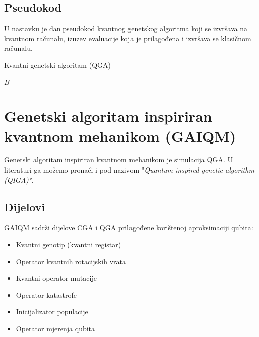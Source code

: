 \documentclass[times, utf8, zavrsni, numeric]{fer}
\begin{document}
\subsection{Pseudokod}
U nastavku je dan pseudokod kvantnog genetskog algoritma koji se izvršava na kvantnom računalu, izuzev evaluacije koja je prilagođena i izvršava se klasičnom računalu.

\begin{algorithm}
\caption{Kvantni genetski algoritam (QGA)}
\label{algo:qga}
\begin{algorithmic}
\ENDWHILE
\RETURN $B$
\end{algorithmic}
\end{algorithm}

\newpage

\section{Genetski algoritam inspiriran kvantnom mehanikom (GAIQM)}
Genetski algoritam inspiriran kvantnom mehanikom je simulacija QGA. U literaturi ga možemo pronaći i pod nazivom "\it Quantum inspired genetic algorithm (QIGA)\rm". \citep{han_phd}

\subsection{Dijelovi}
GAIQM sadrži dijelove CGA i QGA prilagođene korištenoj aproksimaciji qubita:
\begin{itemize}
\item Kvantni genotip (kvantni registar)
\item Operator kvantnih rotacijskih vrata
\item Kvantni operator mutacije
\item Operator katastrofe
\item Inicijalizator populacije
\item Operator mjerenja qubita
\end{itemize}
\end{document}
